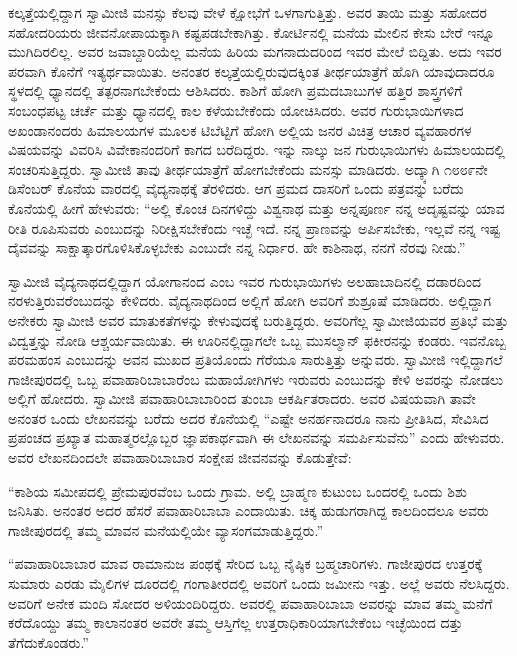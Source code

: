  ಕಲ್ಕತ್ತೆಯಲ್ಲಿದ್ದಾಗ ಸ್ವಾಮೀಜಿ ಮನಸ್ಸು ಕೆಲವು ವೇಳೆ ಕ್ಷೋಭೆಗೆ ಒಳಗಾಗುತ್ತಿತ್ತು. ಅವರ ತಾಯಿ ಮತ್ತು ಸಹೋದರ ಸಹೋದರಿಯರು ಜೀವನೋಪಾಯಕ್ಕಾಗಿ ಕಷ್ಟಪಡಬೇಕಾಗಿತ್ತು. ಕೋರ್ಟಿನಲ್ಲಿ ಮನೆಯ ಮೇಲಿನ ಕೇಸು ಬೇರೆ ಇನ್ನೂ ಮುಗಿದಿರಲಿಲ್ಲ. ಅವರ ಜವಾಬ್ದಾರಿಯೆಲ್ಲ ಮನೆಯ ಹಿರಿಯ ಮಗನಾದುದರಿಂದ ಇವರ ಮೇಲೆ ಬಿದ್ದಿತು. ಅದು ಇವರ ಪರವಾಗಿ ಕೊನೆಗೆ ಇತ್ಯರ್ಥವಾಯಿತು. ಅನಂತರ ಕಲ್ಕತ್ತೆಯಲ್ಲಿರುವುದಕ್ಕಿಂತ ತೀರ್ಥಯಾತ್ರೆಗೆ ಹೊಗಿ ಯಾವುದಾದರೂ ಸ್ಥಳದಲ್ಲಿ ಧ್ಯಾನದಲ್ಲಿ ತತ್ಪರನಾಗಬೇಕೆಂದು ಆಶಿಸಿದರು. ಕಾಶಿಗೆ ಹೋಗಿ ಪ್ರಮದಬಾಬುಗಳ ಹತ್ತಿರ ಶಾಸ್ತ್ರಗಳಿಗೆ ಸಂಬಂಧಪಟ್ಟ ಚರ್ಚೆ ಮತ್ತು ಧ್ಯಾನದಲ್ಲಿ ಕಾಲ ಕಳೆಯಬೇಕೆಂದು ಯೋಚಿಸಿದರು. ಅವರ ಗುರುಭಾಯಿಗಳಾದ ಅಖಂಡಾನಂದರು ಹಿಮಾಲಯಗಳ ಮೂಲಕ ಟಿಬೆಟ್ಟಿಗೆ ಹೋಗಿ ಅಲ್ಲಿಯ ಜನರ ವಿಚಿತ್ರ ಆಚಾರ ವ್ಯವಹಾರಗಳ ವಿಷಯವನ್ನು ವಿವರಿಸಿ ವಿವೇಕಾನಂದರಿಗೆ ಕಾಗದ ಬರೆದಿದ್ದರು. ಇನ್ನು ನಾಲ್ಕು ಜನ ಗುರುಭಾಯಿಗಳು ಹಿಮಾಲಯದಲ್ಲಿ ಸಂಚರಿಸುತ್ತಿದ್ದರು. ಸ್ವಾಮೀಜಿ ತಾವು ತೀರ್ಥಯಾತ್ರೆಗೆ ಹೋಗಬೇಕೆಂದು ಮನಸ್ಸು ಮಾಡಿದರು. ಅದ್ಕ್ಕಾಗಿ ೧೮೮೯ನೇ ಡಿಸೆಂಬರ್ ಕೊನೆಯ ವಾರದಲ್ಲಿ ವೈದ್ಯನಾಥಕ್ಕೆ ತೆರಳಿದರು. ಆಗ ಪ್ರಮದ ದಾಸರಿಗೆ ಒಂದು ಪತ್ರವನ್ನು ಬರೆದು ಕೊನೆಯಲ್ಲಿ ಹೀಗೆ ಹೇಳುವರು: “ಅಲ್ಲಿ ಕೊಂಚ ದಿನಗಳಿದ್ದು ವಿಶ್ವನಾಥ ಮತ್ತು ಅನ್ನಪೂರ್ಣ ನನ್ನ ಅದೃಷ್ಟವನ್ನು ಯಾವ ರೀತಿ ರೂಪಿಸುವರು ಎಂಬುದನ್ನು ನಿರೀಕ್ಷಿಸಬೇಕೆಂದು ಇಚ್ಛೆ ಇದೆ. ನನ್ನ ಪ್ರಾಣವನ್ನು ಅರ್ಪಿಸಬೇಕು, ಇಲ್ಲವೆ ನನ್ನ ಇಷ್ಟ ದೈವವನ್ನು ಸಾಕ್ಷಾತ್ಕಾರಗೊಳಿಸಿಕೊಳ್ಳಬೇಕು ಎಂಬುದೇ ನನ್ನ ನಿರ್ಧಾರ. ಹೇ ಕಾಶಿನಾಥ, ನನಗೆ ನೆರವು ನೀಡು.” 

 ಸ್ವಾಮೀಜಿ ವೈದ್ಯನಾಥದಲ್ಲಿದ್ದಾಗ ಯೋಗಾನಂದ ಎಂಬ ಇವರ ಗುರುಭಾಯಿಗಳು ಅಲಹಾಬಾದಿನಲ್ಲಿ ದಡಾರದಿಂದ ನರಳುತ್ತಿರುವರೆಂಬುದನ್ನು ಕೇಳಿದರು. ವೈದ್ಯನಾಥದಿಂದ ಅಲ್ಲಿಗೆ ಹೋಗಿ ಅವರಿಗೆ ಶುಶ್ರೂಷೆ ಮಾಡಿದರು. ಅಲ್ಲಿದ್ದಾಗ ಅನೇಕರು ಸ್ವಾಮೀಜಿ ಅವರ ಮಾತುಕತೆಗಳನ್ನು ಕೇಳುವುದಕ್ಕೆ ಬರುತ್ತಿದ್ದರು. ಅವರಿಗೆಲ್ಲ ಸ್ವಾಮೀಜಿಯವರ ಪ್ರತಿಭೆ ಮತ್ತು ವಿದ್ವತ್ತನ್ನು ನೋಡಿ ಆಶ್ಚರ್ಯವಾಯಿತು. ಈ ಊರಿನಲ್ಲಿದ್ದಾಗಲೇ ಒಬ್ಬ ಮುಸಲ್ಮಾನ್ ಫಕೀರನನ್ನು ಕಂಡರು. ಇವನೊಬ್ಬ ಪರಮಹಂಸ ಎಂಬುದನ್ನು ಅವನ ಮುಖದ ಪ್ರತಿಯೊಂದು ಗೆರೆಯೂ ಸಾರುತ್ತಿತ್ತು ಅನ್ನುವರು. ಸ್ವಾಮೀಜಿ ಇಲ್ಲಿದ್ದಾಗಲೆ ಗಾಜೀಪುರದಲ್ಲಿ ಒಬ್ಬ ಪವಾಹಾರಿಬಾಬಾರೆಂಬ ಮಹಾಯೋಗಿಗಳು ಇರುವರು ಎಂಬುದನ್ನು ಕೇಳಿ ಅವರನ್ನು ನೋಡಲು ಅಲ್ಲಿಗೆ ಹೋದರು. ಸ್ವಾಮೀಜಿ ಪವಾಹಾರಿಬಾಬಾರಿಂದ ತುಂಬಾ ಆಕರ್ಷಿತರಾದರು. ಅವರ ವಿಷಯವಾಗಿ ತಾವೇ ಅನಂತರ ಒಂದು ಲೇಖನವನ್ನು ಬರೆದು ಅದರ ಕೊನೆಯಲ್ಲಿ “ಎಷ್ಟೇ ಅನರ್ಹನಾದರೂ ನಾನು ಪ್ರೀತಿಸಿದ, ಸೇವಿಸಿದ ಪ್ರಪಂಚದ ಪ್ರಖ್ಯಾತ ಮಹಾತ್ಮರಲ್ಲೊಬ್ಬರ ಜ್ಞಾಪಕಾರ್ಥವಾಗಿ ಈ ಲೇಖನವನ್ನು ಸಮರ್ಪಿಸುವೆನು” ಎಂದು ಹೇಳುವರು. ಅವರ ಲೇಖನದಿಂದಲೇ ಪವಾಹಾರಿಬಾಬಾರ ಸಂಕ್ಷೇಪ ಜೀವನವನ್ನು ಕೊಡುತ್ತೇವೆ: 

 “ಕಾಶಿಯ ಸಮೀಪದಲ್ಲಿ ಪ್ರೇಮಪುರವೆಂಬ ಒಂದು ಗ್ರಾಮ. ಅಲ್ಲಿ ಬ್ರಾಹ್ಮಣ ಕುಟುಂಬ ಒಂದರಲ್ಲಿ ಒಂದು ಶಿಶು ಜನಿಸಿತು. ಅನಂತರ ಅದರ ಹೆಸರೆ ಪವಾಹಾರಿಬಾಬಾ ಎಂದಾಯಿತು. ಚಿಕ್ಕ ಹುಡುಗರಾಗಿದ್ದ ಕಾಲದಿಂದಲೂ ಅವರು ಗಾಜೀಪುರದಲ್ಲಿ ತಮ್ಮ ಮಾವನ ಮನೆಯಲ್ಲಿಯೇ ವ್ಯಾಸಂಗಮಾಡುತ್ತಿದ್ದರು.” 

 “ಪವಾಹಾರಿಬಾಬಾರ ಮಾವ ರಾಮಾನುಜ ಪಂಥಕ್ಕೆ ಸೇರಿದ ಒಬ್ಬ ನೈಷ್ಠಿಕ ಬ್ರಹ್ಮಚಾರಿಗಳು. ಗಾಜೀಪುರದ ಉತ್ತರಕ್ಕೆ ಸುಮಾರು ಎರಡು ಮೈಲಿಗಳ ದೂರದಲ್ಲಿ ಗಂಗಾತೀರದಲ್ಲಿ ಅವರಿಗೆ ಒಂದು ಜಮೀನು ಇತ್ತು. ಅಲ್ಲೆ ಅವರು ನೆಲಸಿದ್ದರು. ಅವರಿಗೆ ಅನೇಕ ಮಂದಿ ಸೋದರ ಅಳಿಯಂದಿರಿದ್ದರು. ಅವರಲ್ಲಿ ಪವಾಹಾರಿಬಾಬಾ ಅವರನ್ನು ಮಾವ ತಮ್ಮ ಮನೆಗೆ ಕರೆದೊಯ್ದು ತಮ್ಮ ಕಾಲಾನಂತರ ಅವರೇ ತಮ್ಮ ಆಸ್ತಿಗೆಲ್ಲ ಉತ್ತರಾಧಿಕಾರಿಯಾಗಬೇಕೆಂಬ ಇಚ್ಛೆಯಿಂದ ದತ್ತು ತೆಗೆದುಕೊಂಡರು.” 

